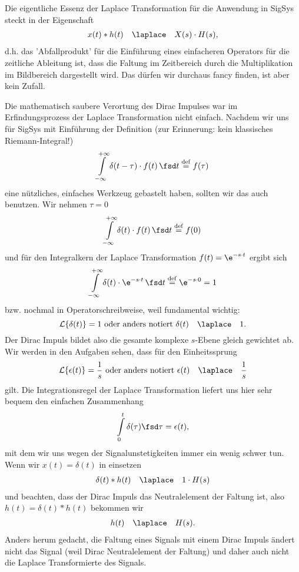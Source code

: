 Die eigentliche Essenz der Laplace Transformation für die Anwendung in
SigSys steckt in der Eigenschaft
\begin{align}
\label{eq:laplace_intro_ast_mult}
x(t) \ast h(t) \quad\laplace\quad X(s) \cdot H(s),
\end{align}
d.h. das 'Abfallprodukt' für die Einführung eines einfacheren Operators
für die zeitliche Ableitung ist, dass die Faltung im Zeitbereich durch die
Multiplikation im Bildbereich dargestellt wird. Das dürfen wir durchaus fancy finden, ist aber
kein Zufall.

Die mathematisch saubere Verortung des Dirac Impulses war im Erfindungsprozess
der Laplace Transformation nicht einfach. Nachdem wir uns für SigSys mit Einführung
der Definition (zur Erinnerung: kein klassisches Riemann-Integral!)
\begin{equation}
\int\limits_{-\infty}^{+\infty} \delta(t-\tau) \cdot f(t) \, \fsd t \stackrel{\mathrm{def}}= f(\tau)
\end{equation}
eine nützliches, einfaches Werkzeug gebastelt haben, sollten wir das auch
benutzen.
Wir nehmen $\tau=0$
\begin{equation}
\int\limits_{-\infty}^{+\infty} \delta(t) \cdot f(t) \, \fsd t \stackrel{\mathrm{def}}= f(0)
\end{equation}
und für den Integralkern der Laplace Transformation $f(t)=\e^{-s \cdot t}$
ergibt sich
\begin{equation}
\int\limits_{-\infty}^{+\infty} \delta(t) \cdot \e^{-s \cdot t} \, \fsd t \stackrel{\mathrm{def}}= \e^{-s \cdot 0} = 1
\end{equation}
bzw. nochmal in Operatorschreibweise, weil fundamental wichtig:
%
\begin{equation}
  \mathcal{L}\{\delta(t)\} = 1
  \text{ oder anders notiert }
  \delta(t) \quad\laplace\quad 1.
\end{equation}
%
Der Dirac Impuls bildet also die gesamte komplexe $s$-Ebene gleich gewichtet ab.
%
Wir werden in den Aufgaben sehen, dass für den Einheitssprung
\begin{equation}
  \mathcal{L}\{\epsilon(t)\} = \frac{1}{s}
  \text{ oder anders notiert }
  \epsilon(t) \quad\laplace\quad \frac{1}{s}
\end{equation}
gilt.
Die Integrationsregel der Laplace Transformation liefert uns hier sehr bequem
den einfachen Zusammenhang
\begin{equation}
  \int\limits_{0}^{t} \delta(\tau)\fsd \tau = \epsilon(t),
\end{equation}
mit dem wir uns wegen der Signalunstetigkeiten immer ein wenig schwer tun.
%
Wenn wir $x(t)=\delta(t)$ in  einsetzen
\begin{align}
\delta(t) \ast h(t) \quad\laplace\quad 1 \cdot H(s)
\end{align}
und beachten, dass der Dirac Impuls das Neutralelement der Faltung ist,
also $h(t) = \delta(t) \ast h(t)$ bekommen wir
\begin{align}
h(t) \quad\laplace\quad H(s).
\end{align}
Anders herum gedacht, die Faltung eines Signals mit einem Dirac Impuls
ändert nicht das Signal (weil Dirac Neutralelement der Faltung) und
daher auch nicht die Laplace Transformierte des Signals.


